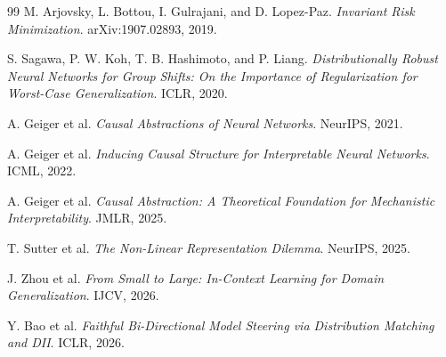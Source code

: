 \documentclass{article}
\begin{document}
\begin{thebibliography}{99}
M. Arjovsky, L. Bottou, I. Gulrajani, and D. Lopez-Paz. \textit{Invariant Risk Minimization}. arXiv:1907.02893, 2019.

S. Sagawa, P. W. Koh, T. B. Hashimoto, and P. Liang. \textit{Distributionally Robust Neural Networks for Group Shifts: On the Importance of Regularization for Worst-Case Generalization}. ICLR, 2020.

A. Geiger et al. \textit{Causal Abstractions of Neural Networks}. NeurIPS, 2021.

A. Geiger et al. \textit{Inducing Causal Structure for Interpretable Neural Networks}. ICML, 2022.

A. Geiger et al. \textit{Causal Abstraction: A Theoretical Foundation for Mechanistic Interpretability}. JMLR, 2025.

T. Sutter et al. \textit{The Non-Linear Representation Dilemma}. NeurIPS, 2025.

J. Zhou et al. \textit{From Small to Large: In-Context Learning for Domain Generalization}. IJCV, 2026.

Y. Bao et al. \textit{Faithful Bi-Directional Model Steering via Distribution Matching and DII}. ICLR, 2026.

\end{thebibliography}
\end{document}

